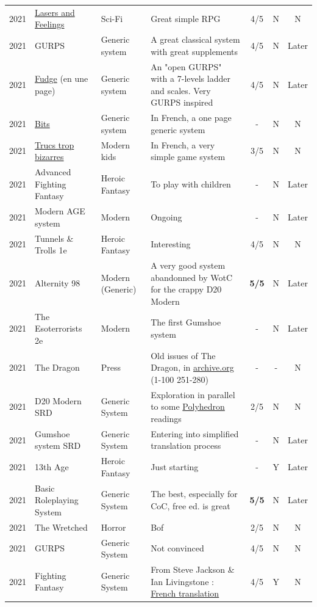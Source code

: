\documentclass[a4paper, 11pt, twoside]{article}
\begin{document}
\begin{longtable}{cp{2cm}p{1.5cm}p{7cm}ccc}
2021 & \href{http://www.onesevendesign.com/laserfeelings/}{Lasers and Feelings} & Sci-Fi & Great simple RPG & 4/5 & N & N\\
2021 & GURPS & Generic system & A great classical system with great supplements & 4/5 & N & Later\\
2021 & \href{https://github.com/orey/jdr/blob/master/Fudge-fr/FudgeEnUnePage-ORey03.pdf}{Fudge} (en une page) & Generic system & An "open GURPS" with a 7-levels ladder and scales. Very GURPS inspired & 4/5 & N & Later\\
2021 & \href{http://komajdr.free.fr/fichiers/BiTs.rar}{Bits } & Generic system & In French, a one page generic system & - & N & N\\
2021 & \href{http://storygame.free.fr/}{Trucs trop bizarres} & Modern kids & In French, a very simple game system & 3/5 & N & N\\
2021 & Advanced Fighting Fantasy & Heroic Fantasy & To play with children & - & N & Later\\
2021 & Modern AGE system & Modern & Ongoing & - & N & Later\\
2021 & Tunnels \& Trolls 1e & Heroic Fantasy & Interesting & 4/5 & N & N\\
2021 & Alternity 98 & Modern (Generic) & A very good system abandonned by WotC for the crappy D20 Modern & \textbf{5/5} & N & Later\\
2021 & The Esoterrorists 2e & Modern & The first Gumshoe system & - & N & Later\\
2021 & The Dragon & Press & Old issues of The Dragon, in \href{https://archive.org/details/DragonMagazine045\_201903}{archive.org} (1-100 251-280) & - & - & N\\
2021 & D20 Modern SRD & Generic System & Exploration in parallel to some \href{https://archive.org/details/Polyhedron105}{Polyhedron} readings & 2/5 & N & N\\
2021 & Gumshoe system SRD & Generic System & Entering into simplified translation process & - & N & Later\\
2021 & 13th Age & Heroic Fantasy & Just starting & - & Y & Later\\
2021 & Basic Roleplaying System & Generic System & The best, especially for CoC, free ed. is great & \textbf{5/5} & N & Later\\
2021 & The Wretched & Horror & Bof & 2/5 & N & N\\
2021 & GURPS & Generic System & Not convinced & 4/5 & N & N\\
2021 & Fighting Fantasy & Generic System & From Steve Jackson \& Ian Livingstone : \href{https://github.com/orey/jdr/tree/master/FightingFantasys-fr}{French translation} & 4/5 & Y & N\\

\end{longtable}
\end{document}

